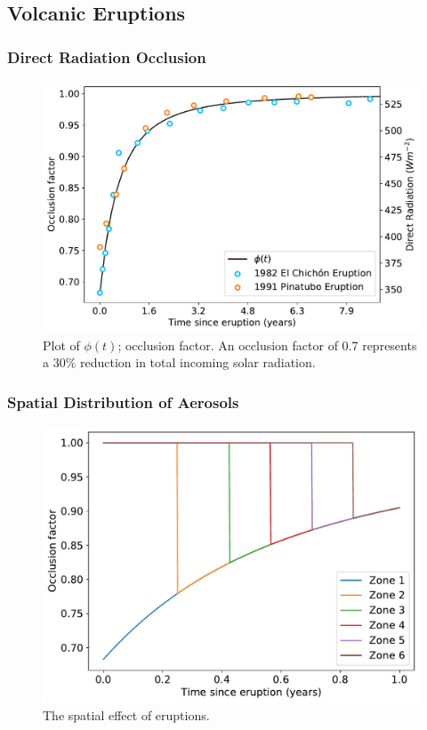 \documentclass[12pt]{article}
\begin{document}
\subsection{Volcanic Eruptions}

\subsubsection{Direct Radiation Occlusion}
\begin{figure}[H]
    \centering
    \includegraphics[scale=0.6]{occlusion.pdf}
    \caption{
        Plot of $\phi(t)$; occlusion factor. An occlusion factor of 0.7
        represents a $30\%$ reduction in total incoming solar radiation.
    }
    \label{fig:occlusion}
\end{figure}
\FloatBarrier

\subsubsection{Spatial Distribution of Aerosols}
\begin{figure}[H]
    \centering
    \includegraphics[scale=0.6]{occlusion_space.pdf}
    \caption{
        The spatial effect of eruptions.
    }
    \label{fig:occlusion_space}
\end{figure}
\FloatBarrier
\end{document}
